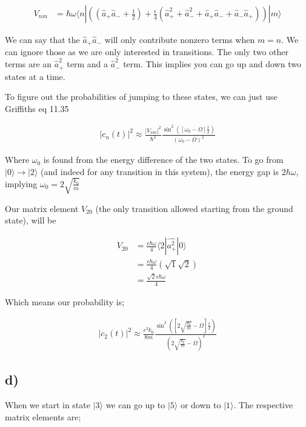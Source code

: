 \documentclass{article}
\newcommand{\p}[1]{\left(#1\right)}
\newcommand{\braket}[1]{\langle#1\rangle}
\newcommand{\bra}[1]{|#1\rangle}
\begin{document}
\begin{align*}
    V_{nm}&={\hbar\omega}\braket{n|\p{\p{\hat{a}_+\hat{a}_-+\frac{1}{2}}+\frac{\epsilon}{4}\p{\hat{a}_{+}^2+\hat{a}_{-}^2+\hat{a}_{+}\hat{a}_{-}+\hat{a}_{-}\hat{a}_{+}}}|m}
\end{align*}

We can say that the $\hat{a}_{+}\hat{a}_-$ will only contribute nonzero terms when $m=n$. We can ignore those as we are only interested in transitions. The only two other terms are an $\hat{a}_+^2$ term and a $\hat{a}_-^2$ term. This implies you can go up and down two states at a time.

To figure out the probabilities of jumping to these states, we can just use Griffiths eq 11.35

\begin{align*}
    |c_n(t)|^2\approx\frac{|V_{nm}|^2}{\hbar^2}\frac{\sin^2\p{[\omega_0-\Omega]\frac{t}{2}}}{\p{\omega_0-\Omega}^2}
\end{align*}

Where $\omega_0$ is found from the energy difference of the two states. To go from $\bra{0}\rightarrow\bra{2}$ (and indeed for any transition in this system), the energy gap is $2\hbar\omega$, implying $\omega_0=2\sqrt{\frac{k_0}{m}}$

Our matrix element $V_{20}$ (the only transition allowed starting from the ground state), will be

\begin{align*}
    V_{20}&=\frac{\epsilon\hbar\omega}{4}\braket{2|\hat{a_+^2}|0}\\[1em]
    &=\frac{\epsilon\hbar\omega}{4}\p{\sqrt{1}\sqrt{2}}\\[1em]
    &=\frac{\sqrt2\epsilon\hbar\omega}{4}
\end{align*}

Which means our probability is;

\begin{align*}
    |c_2(t)|^2\approx\frac{\epsilon^2k_0}{8m}\frac{\sin^2\p{[2\sqrt{\frac{k_0}{m}}-\Omega]\frac{t}{2}}}{\p{2\sqrt{\frac{k_0}{m}}-\Omega}^2}
\end{align*}

\subsection*{d)}

When we start in state $\bra{3}$ we can go up to $\bra{5}$ or down to $\bra{1}$. The respective matrix elements are;
\end{document}
